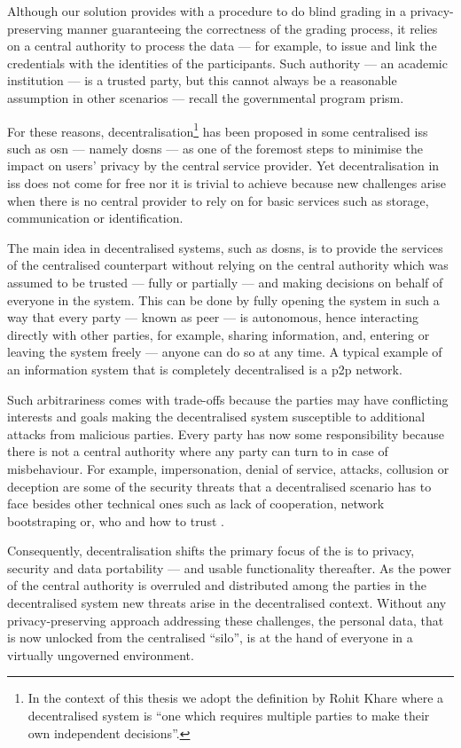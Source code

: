 \documentclass[showtrims,oldfontcommands]{kthesis}
\begin{document}
Although our solution provides with a procedure to do blind grading in a privacy-preserving 
manner guaranteeing the correctness of the grading process, it relies on a central 
authority to process the data --- for example, to issue and link the credentials with 
the identities of the participants. Such authority --- an academic institution --- 
is a trusted party, but this cannot always be a reasonable assumption in other scenarios 
--- recall the governmental program \ac{prism}.

For these reasons, decentralisation\footnote{In the context of this thesis we adopt 
the definition by Rohit Khare where a decentralised system is ``one which requires 
multiple parties to make their own independent decisions''.} has been proposed in 
some centralised \acp{is} such as \ac{osn} --- namely \acp{dosn} --- 
as one of the foremost steps to minimise the impact on users' privacy by the central 
service provider. Yet decentralisation in \acp{is} does not come for 
free nor it is trivial to achieve because new challenges arise when there is no 
central provider to rely on for basic services such as storage, communication or 
identification.

The main idea in decentralised systems, such as \acp{dosn}, is to provide the services 
of the centralised counterpart without relying on the central authority which was 
assumed to be trusted --- fully or partially --- and making decisions on behalf 
of everyone in the system. This can be done by fully opening the system in such 
a way that every party --- known as peer --- is autonomous, hence interacting directly 
with other parties, for example, sharing information, and, entering or leaving the 
system freely --- anyone can do so at any time. A typical example of an information 
system that is completely decentralised is a \ac{p2p} network.

Such arbitrariness comes with trade-offs because the parties may have conflicting 
interests and goals making the decentralised system susceptible to additional attacks 
from malicious parties. Every party has now some responsibility because there is 
not a central authority where any party can turn to in case of misbehaviour. For 
example, impersonation, denial of service, \Sybil attacks, collusion or deception 
are some of the security threats that a decentralised scenario has to face besides 
other technical ones such as lack of cooperation, network bootstraping or, who and 
how to trust \cite{BucheggerA09}.

Consequently, decentralisation shifts the primary focus of the \ac{is} 
to privacy, security and data portability --- and usable functionality thereafter. 
As the power of the central authority is overruled and distributed among the parties 
in the decentralised system new threats arise in the decentralised context. Without 
any privacy-preserving approach addressing these challenges, the personal data, 
that is now unlocked from the centralised ``silo'', is at the hand of everyone in 
a virtually ungoverned environment.
\end{document}
